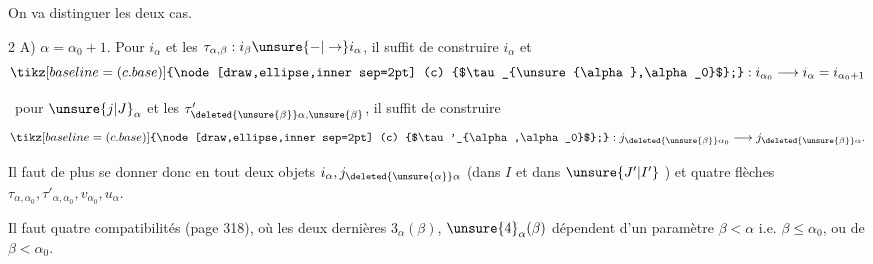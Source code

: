 
On va distinguer  les deux cas.

2 A) $\alpha=\alpha_0+1$. Pour  $i_\alpha$ et les $\tau_{\alpha,\beta}:i_\beta\unsure{-|\to}i_\alpha$, il suffit de construire $i_\alpha$ et 
\[
\tikz[baseline=(c.base)]{\node[draw,ellipse,inner sep=2pt] (c) {$\tau_{\unsure{\alpha},\alpha_0}$};}: i_{\alpha_0}\longrightarrow i_\alpha=i_{\alpha_0+1}
\]

\ pour $\unsure{j|J}_\alpha$ et les $\tau'_{\deleted{\unsure{\beta}}\alpha,\unsure{\beta}}$, il suffit de construire
\[
\tikz[baseline=(c.base)]{\node[draw,ellipse,inner sep=2pt] (c) {$\tau'_{\alpha,\alpha_0}$};}:j_{\deleted{\unsure{\beta}}\alpha_0}\longrightarrow j_{\deleted{\unsure{\beta}}\alpha}.
\]

Il faut de plus se donner
donc en tout deux objets $i_\alpha,j_{\deleted{\unsure{\alpha}}\alpha}$ (dans $I$ et dans $\unsure{J'|I'}$ ) et quatre flèches $\tau_{\alpha,\alpha_0},\tau'_{\alpha,\alpha_0},v_{\alpha_0},u_\alpha$.

Il faut quatre compatibilités (page 318), où les deux dernières $3_\alpha(\beta)$, $\unsure{4}_\alpha(\beta)$ dépendent d'un paramètre $\beta<\alpha$ i.e. \uline{$\beta\leq\alpha_0$}, ou de $\beta<\alpha_0$.


